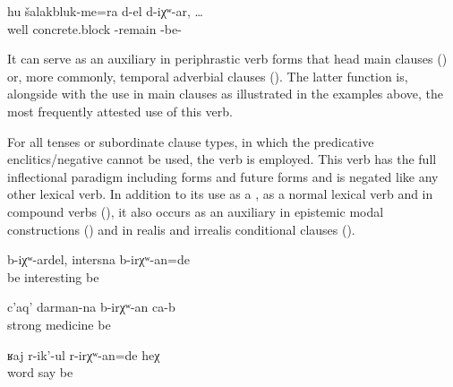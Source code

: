 \begin{exe}
	\ex	\label{ex:If the concrete blocks remained (are left over)}
	\gll	hu		šalakbluk-me=ra	d-el	d-iχʷ-ar,	\ldots\\
		well		concrete.block	-remain\tsc{.pfv}	-be-\\
	\glt	{}
\end{exe}

It can serve as an auxiliary in periphrastic verb forms that head main clauses () or, more commonly, temporal adverbial clauses (). The latter function is, alongside with the use in main clauses as illustrated in the examples above, the most frequently attested use of this verb.

For all tenses or subordinate clause types, in which the predicative enclitics\slash negative  cannot be used, the verb   is employed. This verb has the full inflectional paradigm including  forms  and future forms  and is negated like any other lexical verb. In addition to its use as a , as a normal lexical verb and in compound verbs (), it also occurs as an auxiliary in epistemic modal constructions  () and in realis  and irrealis conditional clauses ().

\begin{exe}
	\ex	\label{ex:If it would be like this, it would be interesting}
	\gll	b-iχʷ-ardel,	intersna	b-irχʷ-an=de\\
		be	interesting	be\\
	\glt	{}

	\ex	\label{ex:It will be a strong medicine}
	\gll	c'aq'	darman-na	b-irχʷ-an	ca-b\\
		strong	medicine be	\\
	\glt	{}

	\ex	\label{ex:She must have been quarreling}
	\gll	ʁaj	r-ik'-ul	r-irχʷ-an=de 	heχ\\
		word	say 	be 	\\
	\glt	{}
\end{exe}

